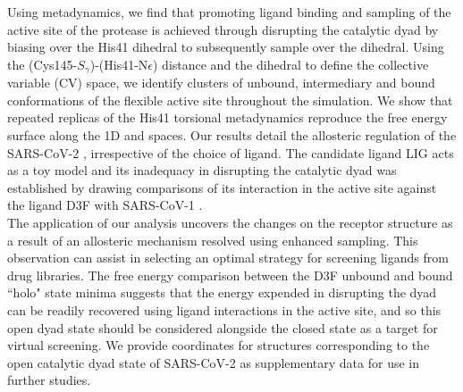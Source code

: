 Using metadynamics, we find that promoting ligand binding and sampling of the active site of the protease is achieved through disrupting the catalytic dyad by biasing over the His41 \dihone dihedral to subsequently sample over the \dihtwo dihedral. Using the (Cys145-$S_{\gamma}$)-(His41-N{$\epsilon$}) distance and the \dihtwo dihedral to define the collective variable (CV) space, we identify clusters of unbound, intermediary and bound conformations of the flexible  active site throughout the simulation. We show that repeated replicas of the His41 torsional metadynamics reproduce the free energy surface along the 1D \dihone and \dihtwo spaces. Our results detail the allosteric regulation of the SARS-CoV-2 \!\!, irrespective of the choice of ligand. The candidate ligand LIG acts as a toy model and its inadequacy in disrupting the catalytic dyad was established by drawing comparisons of its interaction in the  active site against the ligand D3F with SARS-CoV-1 \!\!.\\

The application of our analysis uncovers the changes on the receptor structure as a result of an allosteric mechanism resolved using enhanced sampling. This observation can assist in selecting an optimal strategy for screening ligands from drug libraries. The free energy comparison between the D3F unbound and bound ``holo" state minima suggests that the energy expended in disrupting the dyad can be readily recovered using ligand interactions in the active site, and so this open dyad state should be considered alongside the closed state as a target for virtual screening. We provide coordinates for structures corresponding to the open catalytic dyad state of SARS-CoV-2  as supplementary data for use in further studies. 
